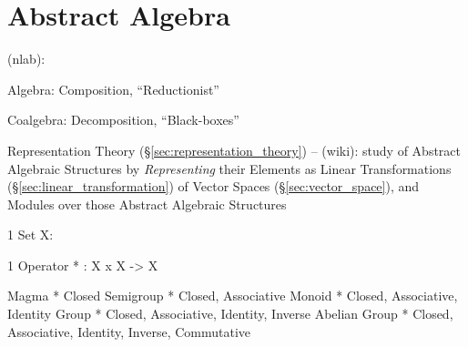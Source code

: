 \part{Abstract Algebra}\label{part:abstract_algebra}

(nlab):


Algebra: Composition, ``Reductionist''

Coalgebra: Decomposition, ``Black-boxes''

\fist Representation Theory (\S\ref{sec:representation_theory}) -- (wiki): study
of Abstract Algebraic Structures by \emph{Representing} their Elements as Linear
Transformations (\S\ref{sec:linear_transformation}) of Vector Spaces
(\S\ref{sec:vector_space}), and Modules over those Abstract Algebraic Structures

\iffalse

1 Set X:

  1 Operator
  * : X x X -> X

    Magma         * Closed
    Semigroup     * Closed, Associative
    Monoid        * Closed, Associative, Identity
    Group         * Closed, Associative, Identity, Inverse
    Abelian Group * Closed, Associative, Identity, Inverse, Commutative

